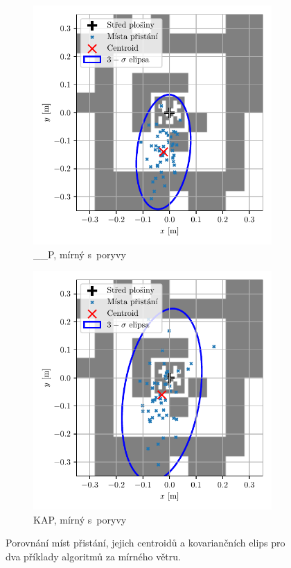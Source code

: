     \begin{figure}
      \centering
      \begin{subfigure}[b]{0.495\textwidth}
        \includegraphics[width=\textwidth]{img/results/__P1_vitr2_pristani.pdf}
        \caption{\_\_P, mírný s~poryvy}
      \end{subfigure}
      \hfill
      \begin{subfigure}[b]{0.495\textwidth}
        \includegraphics[width=\textwidth]{img/results/KAP1_vitr2_pristani.pdf}
        \caption{KAP, mírný s~poryvy}
      \end{subfigure}
      \caption[Příklad porovnání přistání]{Porovnání míst přistání, jejich centroidů a kovariančních elips pro dva příklady algoritmů za mírného větru.}
      \label{fig:presnostPristani}
    \end{figure}
  
